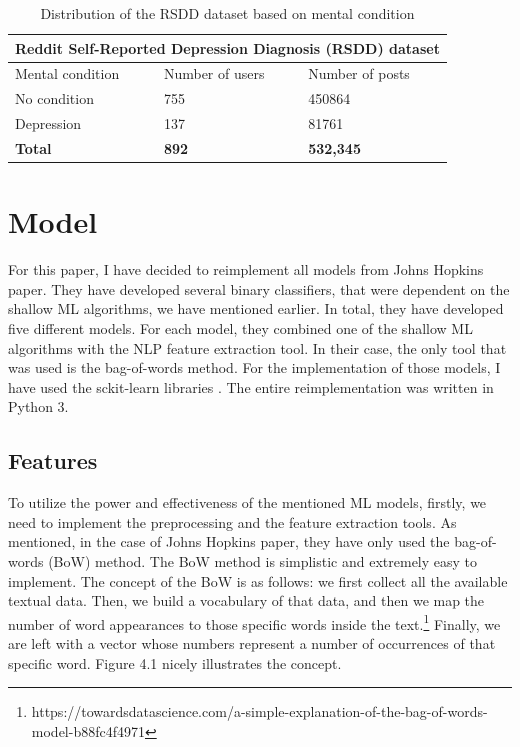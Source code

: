 \documentclass[times, utf8, seminar]{fer}
\begin{document}
\begin{table}[h!]
	\centering
	\begin{tabular}{|p{3cm}|p{3cm}|p{3cm}|} 
		\hline
		\multicolumn{3}{|c|}{Reddit Self-Reported Depression Diagnosis (RSDD) dataset}\\
		\hline
		Mental condition & Number of users & Number of posts \\ [0.5ex] 
		\hline
		No condition & 755 & 450864 \\ 
		Depression  & 137 & 81761 \\ 
		\hline
		\textbf{Total} & \textbf{892} & \textbf{532,345}\\
		\hline
	\end{tabular}
	\caption{Distribution of the RSDD dataset based on mental condition}
	\label{Table:1}
\end{table}

\section{Model}

For this paper, I have decided to reimplement all models from Johns Hopkins paper. They have developed several binary classifiers, that were dependent on the shallow ML algorithms, we have mentioned earlier. In total, they have developed five different models. For each model, they combined one of the shallow ML algorithms with the NLP feature extraction tool. In their case, the only tool that was used is the bag-of-words method. For the implementation of those models, I have used the sckit-learn libraries \citep{python}. The entire reimplementation was written in Python 3. 

\subsection{Features}

To utilize the power and effectiveness of the mentioned ML models, firstly, we need to implement the preprocessing and the feature extraction tools. As mentioned, in the case of Johns Hopkins paper, they have only used the bag-of-words (BoW) method. The BoW method is simplistic and extremely easy to implement. The concept of the BoW is as follows: we first collect all the available textual data. Then, we build a vocabulary of that data, and then we map the number of word appearances to those specific words inside the text.\footnote{https://towardsdatascience.com/a-simple-explanation-of-the-bag-of-words-model-b88fc4f4971} Finally, we are left with a vector whose numbers represent a number of occurrences of that specific word. Figure 4.1 nicely illustrates the concept. \newline
\end{document}
